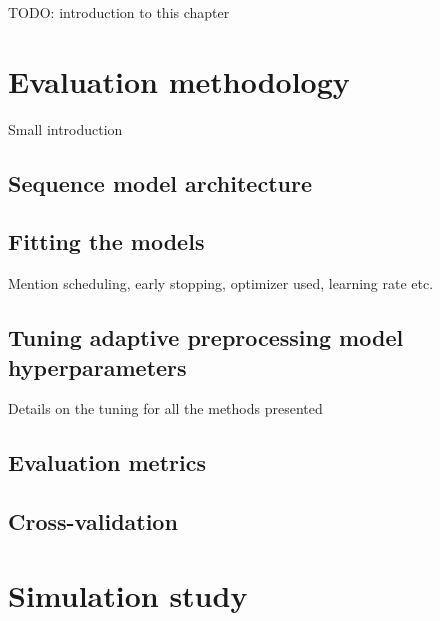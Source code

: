 \documentclass{statsmsc}
\begin{document}
TODO: introduction to this chapter

\section{Evaluation methodology}%
\label{sec:Evaluation methodology}%

Small introduction

\subsection{Sequence model architecture}%
\label{sub:Sequence model architecture}


\subsection{Fitting the models}%
\label{sub:Fitting the models}

Mention scheduling, early stopping, optimizer used, learning rate etc.

\subsection{Tuning adaptive preprocessing model hyperparameters}%
\label{sub:Tuning adaptive preprocessing model hyperparameters}

Details on the tuning for all the methods presented

\subsection{Evaluation metrics}%
\label{sub:Evaluation metrics}


\subsection{Cross-validation}%
\label{sub:Cross-validation}



\section{Simulation study}%
\label{sec:Simulation study}%
\end{document}
